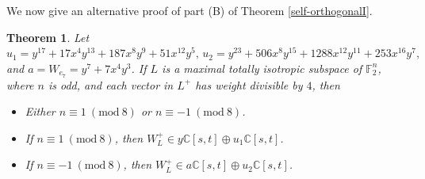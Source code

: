 \documentclass[a4paper,reqno]{amsart}
\newtheorem{theorem}{Theorem}[section]
\theoremstyle{definition}
\theoremstyle{remark} \newtheorem{remark}[theorem]{Remark}
\numberwithin{equation}{section}
\begin{document}
We now give an alternative proof of part (B) of Theorem \ref{self-orthogonalI}.

\begin{theorem}\label{ClassicalThmII} 
    Let \(u_1 = y^{17} + 17x^4y^{13} + 187x^8y^9 + 51x^{12}y^5,\, u_2 = y^{23} + 506x^8y^{15} + 1288x^{12}y^{11} + 253x^{16}y^7,\) and \(a = W_{e_7} = y^7 + 7x^4y^3\). If \(L\) is a maximal totally isotropic subspace of \(\mathbb{F}_2^n\), where \(n\) is odd, and each vector in \(L^+\) has weight divisible by \(4\), then
    \begin{itemize}
        \item[(i)] Either \(n \equiv 1 \ (\mathrm{mod}\ 8)\) or \(n \equiv -1 \ (\mathrm{mod}\ 8)\).
        \item[(ii)] If \(n \equiv 1 \ (\mathrm{mod}\ 8)\), then \(W_L^+ \in y\mathbb{C}[s,t]\oplus u_1\mathbb{C}[s,t]\).
        \item[(iii)] If \(n \equiv -1 \ (\mathrm{mod}\ 8)\), then \(W_L^+ \in a\mathbb{C}[s,t]\oplus u_2\mathbb{C}[s,t]\).
    \end{itemize}
\end{theorem}
\end{document}
